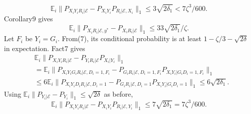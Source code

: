 \documentclass[10pt,a4paper]{article}
\begin{document}
\[\mathbb E_i\|P_{X_iY_iR_i|\mathcal E}-P_{X_iY_i}P_{R_i|\mathcal E,X_i}\|_1\le3\sqrt{2\delta_1}<7\zeta^3/600.\tag{11}\]
Corollary9 gives
\[\mathbb E_i\|P_{X_iR_i|\mathcal E,y^*}-P_{X_iR_i|\mathcal E}\|_1\le33\sqrt{2\delta_1}/\zeta.\tag{12}\]
Let $F_i$ be $Y_i=G_i$. From(7), its conditional probability is at least $1-\zeta/3-\sqrt{2\delta}$ in expectation. Fact7 gives
\begin{align*}&\mathbb E_i\|P_{X_iY_iR_i|\mathcal E}-P_{Y_iR_i|\mathcal E}P_{X_i|Y_i}\|_1\\&=\mathbb E_i\|P_{X_iY_iG_iR_i|\mathcal E,D_i=1,F_i}-P_{G_iR_i|\mathcal E,D_i=1,F_i}P_{X_iY_i|G_iD_i=1,F_i}\|_1\\&\le6\mathbb E_i\|P_{X_iY_iD_iR_i|\mathcal E,D_i=1}-P_{G_iR_i|\mathcal E,D_i=1}P_{X_iY_i|G_iD_i=1}\|_1\le6\sqrt{2\delta_1}.\end{align*}
Using $\mathbb E_i\|P_{Y_i|\mathcal E}-P_{Y_i}\|_1\le\sqrt{2\delta}$ as before,
\[\mathbb E_i\|P_{X_iY_iR_i|\mathcal E}-P_{X_iY_i}P_{R_i|\mathcal E,Y_i}\|_1\le7\sqrt{2\delta_1}=7\zeta^3/600.\tag{13}\]
\end{document}
